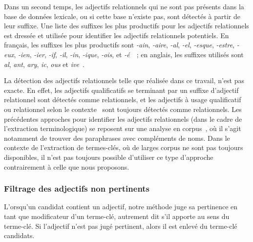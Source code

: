         Dans un second temps, les adjectifs relationnels qui ne sont pas
        présents dans la base de données lexicale, ou si cette base n'existe
        pas, sont détectés à partir de leur suffixe. Une liste des suffixes les
        plus productifs pour les adjectifs relationnels est dressée et utilisée
        pour identifier les adjectifs relationnels potentiels. En français, les
        suffixes les plus productifs sont \textit{-ain}, \textit{-aire},
        \textit{-al}, \textit{-el}, \textit{-esque}, \textit{-estre},
        \textit{-eux}, \textit{-ien}, \textit{-ier}, \textit{-if}, \textit{-il},
        \textit{-in}, \textit{-ique}, \textit{-ois}, et
        \textit{-é}~\cite{guyon1993adjectifsrelationnels}~; en anglais, les
        suffixes utilisés sont \textit{al}, \textit{ant},
        \textit{ary}, \textit{ic}, \textit{ous} et
        \textit{ive}~\cite{grabar2006terminologystructuring}.

        La détection des adjectifs relationnels telle que réalisée dans ce
        travail, n'est pas exacte. En effet, les adjectifs qualificatifs se
        terminant par un suffixe d'adjectif relationnel sont détectés comme
        relationnels, et les adjectifs à usage qualificatif ou relationnel selon
        le contexte~\cite{maniez2009denominaladjectives} sont toujours détectés
        comme relationnels. Les précédentes approches pour identifier les
        adjectifs relationnels (dans le cadre de l'extraction terminologique) se
        reposent sur une analyse en
        corpus~\cite{daille2001relationaladjectives,maniez2005automaticrelationaladjectiveidentification,harastani2013relationaladjectivetranslation},
        où il s'agit notamment de trouver des paraphrases avec compléments de
        noms. Dans le contexte de l'extraction de termes-clés, où de larges
        corpus ne sont pas toujours disponibles, il n'est pas toujours possible
        d'utiliser ce type d'approche contrairement à celle que nous proposons.

      \subsubsection{Filtrage des adjectifs non pertinents}
      \label{subsubsec:main-automatic_keyphrase_annotation-keyphrase_candidate_selection-modifiers_filtering-adjective_filtering}
        L'orsqu'un candidat contient un adjectif, notre méthode juge sa
        pertinence en tant que modificateur d'un terme-clé, autrement dit s'il
        apporte au sens du terme-clé. Si l'adjectif n'est pas jugé pertinent,
        alors il est enlevé du terme-clé candidats.

